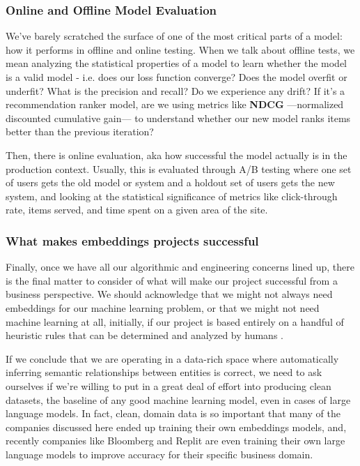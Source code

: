 \documentclass[11pt, table]{diazessay} %
\begin{document}
\begin{sloppypar}
\subsubsection{Online and Offline Model Evaluation}
We've barely scratched the surface of one of the most critical parts of a model: how it performs in offline and online testing. When we talk about offline tests, we mean analyzing the statistical properties of a model to learn whether the model is a valid model - i.e. does our loss function converge? Does the model overfit or underfit? What is the precision and recall? Do we experience any drift? If it's a recommendation ranker model, are we using metrics like \textbf{NDCG} ---normalized discounted cumulative gain--- to understand whether our new model ranks items better than the previous iteration?

Then, there is online evaluation, aka how successful the model actually is in the production context. Usually, this is evaluated through A/B testing where one set of users gets the old model or system and a holdout set of users gets the new system, and looking at the statistical significance of metrics like click-through rate, items served, and time spent on a given area of the site.

\subsubsection{What makes embeddings projects successful}
Finally, once we have all our algorithmic and engineering concerns lined up, there is the final matter to consider of what will make our project successful from a business perspective. We should acknowledge that we might not always need embeddings for our machine learning problem, or that we might not need machine learning at all, initially, if our project is based entirely on a handful of heuristic rules that can be determined and analyzed by humans \citep{zinkevich2017rules}.

If we conclude that we are operating in a data-rich space where automatically inferring semantic relationships between entities is correct, we need to ask ourselves if we're willing to put in a great deal of effort into producing clean datasets, the baseline of any good machine learning model, even in cases of large language models. In fact, clean, domain data is so important that many of the companies discussed here ended up training their own embeddings models, and, recently companies like Bloomberg \citep{wu2023bloomberggpt} and Replit \citep{Shabani_2023} are even training their own large language models to improve accuracy for their specific business domain.


\end{sloppypar}
\end{document}
